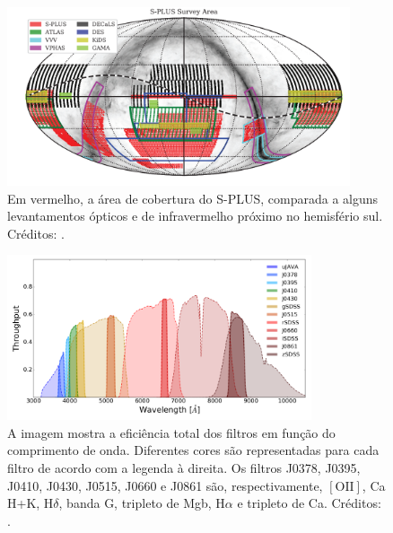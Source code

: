 \begin{figure}[h]
  \centering 
  \includegraphics[width=0.9\textwidth]{Imagens/surveyarea.PNG} 
  \caption[Área de cobertura do S-PLUS.]{Em vermelho, a área de cobertura do S-PLUS, comparada a alguns levantamentos ópticos e de infravermelho próximo no hemisfério sul. Créditos: .}
  \label{fig:surveyarea} 
\end{figure}

\begin{figure}[h]
  \centering 
  \includegraphics[width=0.8\textwidth]{Imagens/dozefiltros.PNG} 
  \caption[Sistema de 12 filtros do S-PLUS.]{A imagem mostra a eficiência total dos filtros em função do comprimento de onda. Diferentes cores são representadas para cada filtro de acordo com a legenda à direita. Os filtros J0378, J0395, J0410, J0430, J0515, J0660 e J0861 são, respectivamente, $[\text{OII}]$, Ca H+K, H$\delta$, banda G, tripleto de Mgb, H$\alpha$ e tripleto de Ca. Créditos: .}
  \label{fig:dozefiltros} 
\end{figure}

